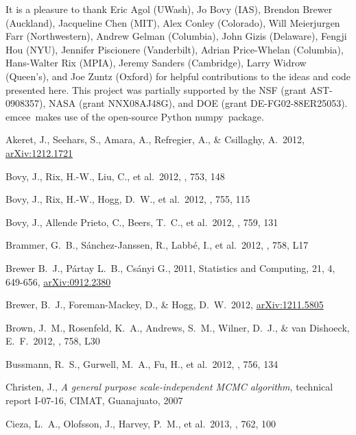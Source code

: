 \documentclass[12pt,preprint]{aastex}
\newcommand{\arxiv}[1]{\href{http://arxiv.org/abs/#1}{arXiv:#1}}
\newcommand{\project}[1]{{\sffamily #1}}
\newcommand{\numpy}{\project{numpy}}
\newcommand{\thisplain}{emcee}
\newcommand{\this}{\project{\thisplain}}
\begin{document}
\acknowledgments It is a pleasure to thank
Eric Agol (UWash),
Jo Bovy (IAS),
Brendon Brewer (Auckland),
Jacqueline Chen (MIT),
Alex Conley (Colorado),
Will Meierjurgen Farr (Northwestern),
Andrew Gelman (Columbia),
John Gizis (Delaware),
Fengji Hou (NYU),
Jennifer Piscionere (Vanderbilt),
Adrian Price-Whelan (Columbia),
Hans-Walter Rix (MPIA),
Jeremy Sanders (Cambridge),
Larry Widrow (Queen's), and
Joe Zuntz (Oxford)
for helpful contributions to the ideas and code presented here.
This project was partially supported by the NSF (grant AST-0908357), NASA
(grant NNX08AJ48G), and DOE (grant DE-FG02-88ER25053).
\this\ makes use of the open-source Python \numpy\ package.

\begin{thebibliography}{}\raggedright
{} Akeret, J., Seehars, S., Amara, A.,
Refregier, A., \& Csillaghy, A.\ 2012, \arxiv{1212.1721}

Bovy, J., Rix, H.-W., Liu, C., et al.\ 2012, \apj, 753, 148

 Bovy, J., Rix, H.-W.,
Hogg, D.~W., et al.\ 2012, \apj, 755, 115

Bovy, J., Allende Prieto, C., Beers, T.~C., et al.\ 2012, \apj, 759, 131

Brammer, G.~B., S{\'a}nchez-Janssen, R., Labb{\'e}, I., et al.\ 2012,
\apjl, 758, L17

Brewer B.~J., P{\'a}rtay L.~B., Cs{\'a}nyi G., 2011,
Statistics and Computing, 21, 4, 649-656, \arxiv{0912.2380}

 Brewer, B.~J.,
Foreman-Mackey, D., \& Hogg, D.~W.\ 2012, \arxiv{1211.5805}

Brown, J.~M., Rosenfeld, K.~A., Andrews, S.~M., Wilner, D.~J.,
\& van Dishoeck, E.~F.\ 2012, \apjl, 758, L30

Bussmann, R.~S., Gurwell, M.~A., Fu, H., et al.\ 2012, \apj, 756, 134

{Christen}, J., \emph{A general purpose scale-independent MCMC algorithm},
technical report I-07-16, CIMAT, Guanajuato, 2007

Cieza, L.~A., Olofsson, J., Harvey, P.~M., et al.\ 2013, \apj, 762, 100


\end{thebibliography}
\end{document}
